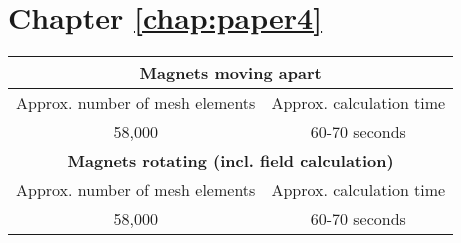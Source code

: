 \section{Chapter \ref{chap:paper4}}
\begin{table}[h!]
    \centering
    \begin{tabular}{cc}
        \hline \hline \multicolumn{2}{c}{\textbf{Magnets moving apart}} \\ \hline
         Approx. number of mesh elements & Approx. calculation time \\
         58,000 & 60-70 seconds \\ \hline\hline
         \multicolumn{2}{c}{\textbf{Magnets rotating (incl. field calculation)}} \\ \hline
         Approx. number of mesh elements & Approx. calculation time \\
         58,000 & 60-70 seconds \\ \hline\hline
    \end{tabular}
\end{table}